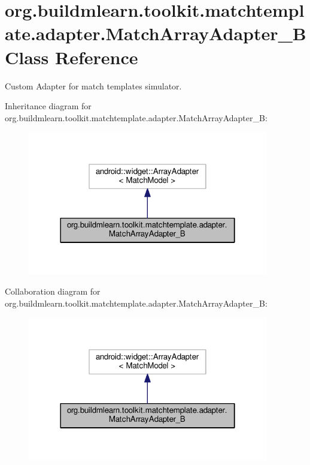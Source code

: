 \hypertarget{classorg_1_1buildmlearn_1_1toolkit_1_1matchtemplate_1_1adapter_1_1MatchArrayAdapter__B}{}\section{org.\+buildmlearn.\+toolkit.\+matchtemplate.\+adapter.\+Match\+Array\+Adapter\+\_\+B Class Reference}
\label{classorg_1_1buildmlearn_1_1toolkit_1_1matchtemplate_1_1adapter_1_1MatchArrayAdapter__B}


Custom Adapter for match template\textquotesingle{}s simulator.  




Inheritance diagram for org.\+buildmlearn.\+toolkit.\+matchtemplate.\+adapter.\+Match\+Array\+Adapter\+\_\+B\+:
\nopagebreak
\begin{figure}[H]
\begin{center}
\leavevmode
\includegraphics[width=298pt]{classorg_1_1buildmlearn_1_1toolkit_1_1matchtemplate_1_1adapter_1_1MatchArrayAdapter__B__inherit__graph}
\end{center}
\end{figure}


Collaboration diagram for org.\+buildmlearn.\+toolkit.\+matchtemplate.\+adapter.\+Match\+Array\+Adapter\+\_\+B\+:
\nopagebreak
\begin{figure}[H]
\begin{center}
\leavevmode
\includegraphics[width=298pt]{classorg_1_1buildmlearn_1_1toolkit_1_1matchtemplate_1_1adapter_1_1MatchArrayAdapter__B__coll__graph}
\end{center}
\end{figure}
